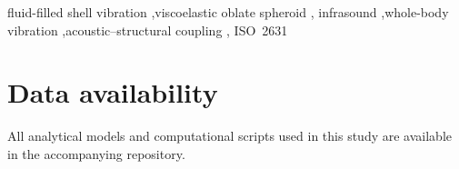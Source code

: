 \documentclass[review]{elsarticle}
\begin{document}
\begin{frontmatter}
\begin{keyword}
fluid-filled shell vibration \sep viscoelastic oblate spheroid \sep
infrasound \sep whole-body vibration \sep acoustic--structural coupling \sep
ISO~2631
\end{keyword}

\end{frontmatter}
















\section*{Data availability}
All analytical models and computational scripts used in this study are
available in the accompanying repository.
\end{document}
